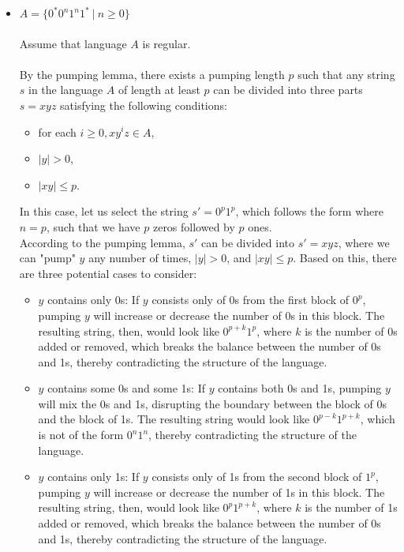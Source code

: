 \documentclass[12pt]{article}
\begin{document}
\begin{itemize}
	\item $A= \{ 0^*0^n1^n1^* \ | \ n \geq 0\}$\\
\\
Assume that language $A$ is regular.\\
\\
By the pumping lemma, there exists a pumping length $p$ such that any string $s$ in the language $A$ of length at least $p$ can be divided into three parts $s = xyz$ satisfying the following conditions:
\begin{itemize}
    \item for each $i \geq 0, xy^iz \in A$,
    \item $|y| > 0$,
    \item $|xy| \leq p$.
\end{itemize}

In this case, let us select the string $s' = 0^p1^p$, which follows the form where $n = p$, such that we have $p$ zeros followed by $p$ ones.\\

According to the pumping lemma, $s'$ can be divided into $s' = xyz$, where we can "pump" $y$ any number of times, $|y| > 0$, and $|xy| \leq p$. Based on this, there are three potential cases to consider:

\begin{itemize}
    \item $y$ contains only 0s: If $y$ consists only of 0s from the first block of $0^p$, pumping $y$ will increase or decrease the number of 0s in this block. The resulting string, then, would look like $0^{p+k}1^p$, where $k$ is the number of 0s added or removed, which breaks the balance between the number of 0s and 1s, thereby contradicting the structure of the language.
    
    \item $y$ contains some 0s and some 1s: If $y$ contains both 0s and 1s, pumping $y$ will mix the 0s and 1s, disrupting the boundary between the block of 0s and the block of 1s. The resulting string would look like $0^{p-k}1^{p+k}$, which is not of the form $0^n1^n$, thereby contradicting the structure of the language.
    
    \item $y$ contains only 1s: If $y$ consists only of 1s from the second block of $1^p$, pumping $y$ will increase or decrease the number of 1s in this block. The resulting string, then, would look like $0^p1^{p+k}$, where $k$ is the number of 1s added or removed, which breaks the balance between the number of 0s and 1s, thereby contradicting the structure of the language.
\end{itemize}


\end{itemize}
\end{document}
